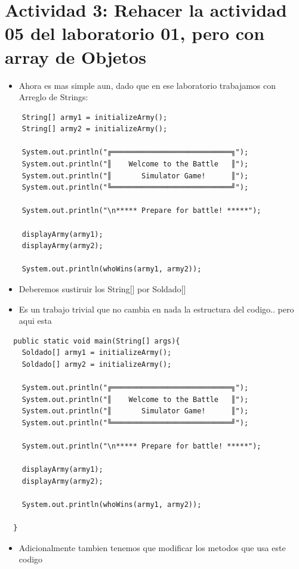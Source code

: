 \documentclass{article}
\begin{document}
\section{Actividad 3: Rehacer la actividad 05 del laboratorio 01, pero con array de Objetos}
\begin{itemize}
    \item Ahora es mas simple aun, dado que en ese laboratorio trabajamos con Arreglo de Strings:
\end{itemize}
\begin{lstlisting}
    String[] army1 = initializeArmy(); 
    String[] army2 = initializeArmy();

    System.out.println("╔════════════════════════════╗");
    System.out.println("║    Welcome to the Battle   ║");
    System.out.println("║       Simulator Game!      ║");
    System.out.println("╚════════════════════════════╝");
    
    System.out.println("\n***** Prepare for battle! *****");

    displayArmy(army1);
    displayArmy(army2);

    System.out.println(whoWins(army1, army2));
\end{lstlisting}
\begin{itemize}
    \item Deberemos sustiruir los String[] por Soldado[]
    \item Es un trabajo trivial que no cambia en nada la estructura del codigo.. pero aqui esta
\end{itemize}
\begin{lstlisting}
  public static void main(String[] args){
    Soldado[] army1 = initializeArmy(); 
    Soldado[] army2 = initializeArmy();

    System.out.println("╔════════════════════════════╗");
    System.out.println("║    Welcome to the Battle   ║");
    System.out.println("║       Simulator Game!      ║");
    System.out.println("╚════════════════════════════╝");
    
    System.out.println("\n***** Prepare for battle! *****");

    displayArmy(army1);
    displayArmy(army2);

    System.out.println(whoWins(army1, army2));

  }
\end{lstlisting}
\begin{itemize}
    \item Adicionalmente tambien tenemos que modificar los metodos que usa este codigo
\end{itemize}
\end{document}
